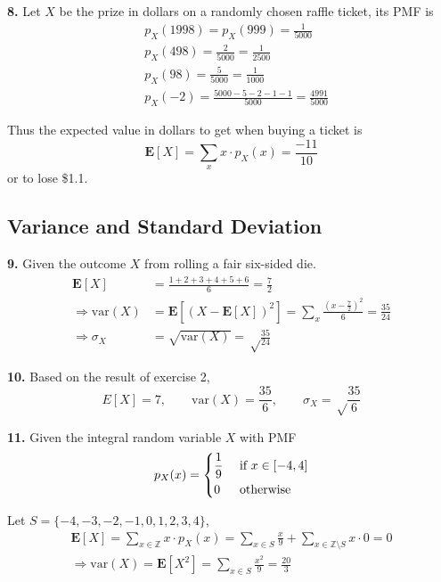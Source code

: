 \documentclass[a4paper,12pt]{article}
\newcommand{\E}{\mathbf E}
\newcommand{\var}{\mathrm{var}}
\newcommand{\exercise}[1]{\noindent\textbf{#1.}}
\begin{document}
\exercise 8  Let $X$ be the prize in dollars on a randomly chosen
raffle ticket, its PMF is
\begin{align*}
  & p_X(1998) = p_X(999) = \frac{1}{5000}\\
  & p_X(498) = \frac{2}{5000} = \frac{1}{2500}\\
  & p_X(98) = \frac{5}{5000} = \frac{1}{1000}\\
  & p_X(-2) = \frac{5000-5-2-1-1}{5000} = \frac{4991}{5000}
\end{align*}

Thus the expected value in dollars to get when buying a ticket is
\[\E[X] = \sum_x x\cdot p_X(x) = \frac{-11}{10}\]
or to lose \$1.1.

\subsection{Variance and Standard Deviation}
\exercise{9} Given the outcome $X$ from rolling a fair six-sided die.
\begin{align*}
  \E[X] &= \frac{1+2+3+4+5+6}{6} = \frac{7}{2}\\
  \Longrightarrow \var(X) &= \E\left[(X - \E[X])^2\right]
  = \sum_x \frac{(x - \frac{7}{2})^2}{6} = \frac{35}{24}\\
  \Longrightarrow \sigma_X &= \sqrt{\var(X)} = \sqrt\frac{35}{24}
\end{align*}

\exercise{10} Based on the result of exercise 2,
\[E[X] = 7,\qquad\var(X) = \frac{35}{6},\qquad\sigma_X = \sqrt\frac{35}{6}\]

\exercise{11} Given the integral random variable $X$ with PMF
\[p_X(x) = \begin{dcases}
  \frac{1}{9} &\text{ if } x \in [-4, 4]\\
  0 &\text{ otherwise}
\end{dcases}\]

Let $S = \{-4, -3, -2, -1, 0, 1, 2, 3, 4\}$,
\begin{multline*}
  \E[X] = \sum_{x\in\mathbb Z}x\cdot p_X(x)
  = \sum_{x\in S}\frac{x}{9} + \sum_{x\in\mathbb Z\setminus S}x\cdot 0 = 0\\
  \Longrightarrow \var(X) = \E\left[X^2\right]
  = \sum_{x\in S}\frac{x^2}{9} = \frac{20}{3}
\end{multline*}
\end{document}
